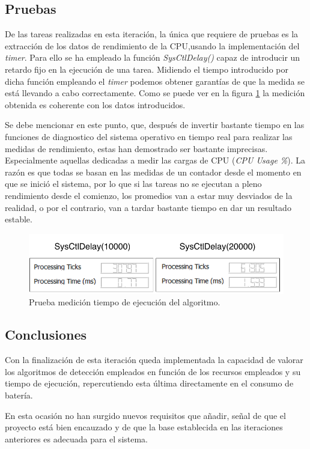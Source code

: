     \subsection{Pruebas}
        
        De las tareas realizadas en esta iteración, la única que requiere de pruebas es la extracción de los datos de rendimiento de la CPU,usando la implementación del \textit{timer}. Para ello se ha empleado la función\textit{ SysCtlDelay()} capaz de introducir un retardo fijo en la ejecución de una tarea. Midiendo el tiempo introducido por dicha función empleando el \textit{timer} podemos obtener garantías de que la medida se está llevando a cabo correctamente. Como se puede ver en la figura \ref{fig:performanceTest} la medición obtenida es coherente con los datos introducidos.
        
        Se debe mencionar en este punto, que, después de invertir bastante tiempo en las funciones de diagnostico del sistema operativo en tiempo real para realizar las medidas de rendimiento, estas han demostrado ser bastante imprecisas. Especialmente aquellas dedicadas a medir las cargas de CPU (\textit{CPU Usage \%}). La razón es que todas se basan en las medidas de un contador desde el momento en que se inició el sistema, por lo que si las tareas no se ejecutan a pleno rendimiento desde el comienzo, los promedios van a estar muy desviados de la realidad, o por el contrario, van a tardar bastante tiempo en dar un resultado estable.
        
        \begin{figure}[H]
                \centering
                        \includegraphics[width = 0.9 \linewidth]{figuras/PerformanceTest.pdf}
                \caption{Prueba medición tiempo de ejecución del algoritmo.}
                \label{fig:performanceTest}
        \end{figure}

    \subsection{Conclusiones}
    
    Con la finalización de esta iteración queda implementada la capacidad de valorar los algoritmos de detección empleados en función de los recursos empleados y su tiempo de ejecución, repercutiendo esta última directamente en el consumo de batería.
    
    En esta ocasión no han surgido nuevos requisitos que añadir, señal de que el proyecto está bien encauzado y de que la base establecida en las iteraciones anteriores es adecuada para el sistema.